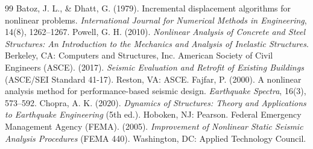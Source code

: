 \documentclass[11pt,letterpaper]{article}
\begin{document}
\begin{thebibliography}{99}
     Batoz, J. L., \& Dhatt, G. (1979). Incremental displacement algorithms for nonlinear problems. \textit{International Journal for Numerical Methods in Engineering}, 14(8), 1262--1267.
     Powell, G. H. (2010). \textit{Nonlinear Analysis of Concrete and Steel Structures: An Introduction to the Mechanics and Analysis of Inelastic Structures}. Berkeley, CA: Computers and Structures, Inc.
     American Society of Civil Engineers (ASCE). (2017). \textit{Seismic Evaluation and Retrofit of Existing Buildings} (ASCE/SEI Standard 41-17). Reston, VA: ASCE.
     Fajfar, P. (2000). A nonlinear analysis method for performance-based seismic design. \textit{Earthquake Spectra}, 16(3), 573--592.
     Chopra, A. K. (2020). \textit{Dynamics of Structures: Theory and Applications to Earthquake Engineering} (5th ed.). Hoboken, NJ: Pearson.
     Federal Emergency Management Agency (FEMA). (2005). \textit{Improvement of Nonlinear Static Seismic Analysis Procedures} (FEMA 440). Washington, DC: Applied Technology Council.
\end{thebibliography}
\end{document}
